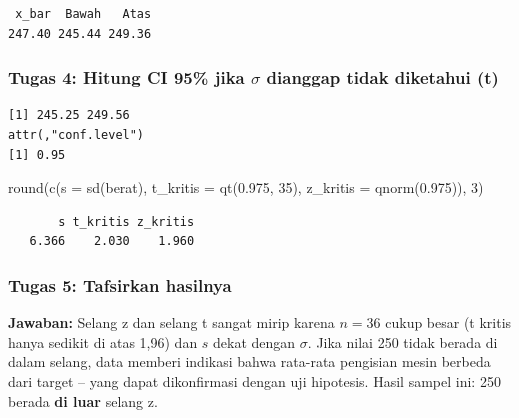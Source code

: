 \documentclass[
  indonesian,
  letterpaper,
]{book}
\newenvironment{Shaded}{\begin{snugshade}}{\end{snugshade}}
\newcommand{\AttributeTok}[1]{\textcolor[rgb]{0.40,0.45,0.13}{#1}}
\newcommand{\DecValTok}[1]{\textcolor[rgb]{0.68,0.00,0.00}{#1}}
\newcommand{\FloatTok}[1]{\textcolor[rgb]{0.68,0.00,0.00}{#1}}
\newcommand{\FunctionTok}[1]{\textcolor[rgb]{0.28,0.35,0.67}{#1}}
\newcommand{\NormalTok}[1]{\textcolor[rgb]{0.00,0.23,0.31}{#1}}
\newcommand{\SpecialCharTok}[1]{\textcolor[rgb]{0.37,0.37,0.37}{#1}}
\begin{document}
\begin{verbatim}
 x_bar  Bawah   Atas 
247.40 245.44 249.36 
\end{verbatim}

\subsubsection{\texorpdfstring{Tugas 4: Hitung CI 95\% jika \(\sigma\)
dianggap tidak diketahui
(t)}{Tugas 4: Hitung CI 95\% jika \textbackslash sigma dianggap tidak diketahui (t)}}\label{tugas-4-hitung-ci-95-jika-sigma-dianggap-tidak-diketahui-t}

\begin{Shaded}
\end{Shaded}

\begin{verbatim}
[1] 245.25 249.56
attr(,"conf.level")
[1] 0.95
\end{verbatim}

\begin{Shaded}
\begin{Highlighting}[]
\FunctionTok{round}\NormalTok{(}\FunctionTok{c}\NormalTok{(}\AttributeTok{s =} \FunctionTok{sd}\NormalTok{(berat), }\AttributeTok{t\_kritis =} \FunctionTok{qt}\NormalTok{(}\FloatTok{0.975}\NormalTok{, }\DecValTok{35}\NormalTok{), }\AttributeTok{z\_kritis =} \FunctionTok{qnorm}\NormalTok{(}\FloatTok{0.975}\NormalTok{)), }\DecValTok{3}\NormalTok{)}
\end{Highlighting}
\end{Shaded}

\begin{verbatim}
       s t_kritis z_kritis 
   6.366    2.030    1.960 
\end{verbatim}

\subsubsection{Tugas 5: Tafsirkan
hasilnya}\label{tugas-5-tafsirkan-hasilnya}

\textbf{Jawaban:} Selang z dan selang t sangat mirip karena \(n = 36\)
cukup besar (t kritis hanya sedikit di atas 1,96) dan \(s\) dekat dengan
\(\sigma\). Jika nilai 250 tidak berada di dalam selang, data memberi
indikasi bahwa rata-rata pengisian mesin berbeda dari target -- yang
dapat dikonfirmasi dengan uji hipotesis. Hasil sampel ini: 250 berada
\textbf{di luar} selang z.
\end{document}
